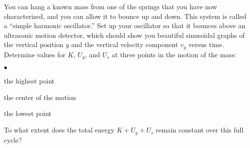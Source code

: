 \documentclass[12pt]{article}
\newcommand{\squishlist}{
   \begin{list}{$\bullet$}
    { \setlength{\itemsep}{0pt}      \setlength{\parsep}{3pt}
      \setlength{\topsep}{3pt}       \setlength{\partopsep}{0pt}
      \setlength{\leftmargin}{1.5em} \setlength{\labelwidth}{1em}
      \setlength{\labelsep}{0.5em} } }
\newcommand{\squishend}{
    \end{list}  }
\begin{document}
\bigskip

\medskip

You can hang a known mass from one of the springs that you have now 
characterized, and you can allow it to bounce up and down.  This system
is called a ``simple harmonic oscillator.''  Set up your oscillator so that 
it bounces above an ultrasonic motion detector, which should show
you beautiful sinusoidal graphs of the vertical position $y$ and the
vertical velocity component $v_y$ versus time.
Determine values for $K$, $U_g$, and $U_s$ at three points in the motion of 
the mass:
\squishlist
\item the highest point
\item the center of the motion
\item the lowest point
\squishend
To what extent does the total energy $K + U_g + U_s$ remain constant
over this full cycle?
\end{document}
